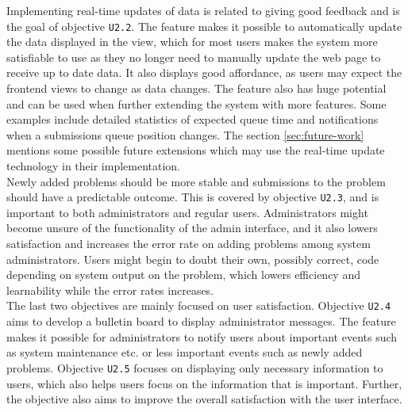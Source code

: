 Implementing real-time updates of data is related to giving good feedback and is the goal of objective \texttt{U2.2}. The feature makes it possible to automatically update the data displayed in the view, which for most users makes the system more satisfiable to use as they no longer need to manually update the web page to receive up to date data. It also displays good affordance, as users may expect the frontend views to change as data changes. The feature also has huge potential and can be used when further extending the system with more features. Some examples include detailed statistics of expected queue time and notifications when a submissions queue position changes. The section \ref{sec:future-work} mentions some possible future extensions which may use the real-time update technology in their implementation. \\

Newly added problems should be more stable and submissions to the problem should have a predictable outcome. This is covered by objective \texttt{U2.3}, and is important to both administrators and regular users. Administrators might become unsure of the functionality of the admin interface, and it also lowers satisfaction and increases the error rate on adding problems among system administrators. Users might begin to doubt their own, possibly correct, code depending on system output on the problem, which lowers efficiency and learnability while the error rates increases. \\

The last two objectives are mainly focused on user satisfaction. Objective \texttt{U2.4} aims to develop a bulletin board to display administrator messages. The feature makes it possible for administrators to notify users about important events such as system maintenance etc. or less important events such as newly added problems. Objective \texttt{U2.5} focuses on displaying only necessary information to users, which also helps users focus on the information that is important. Further, the objective also aims to improve the overall satisfaction with the user interface.
